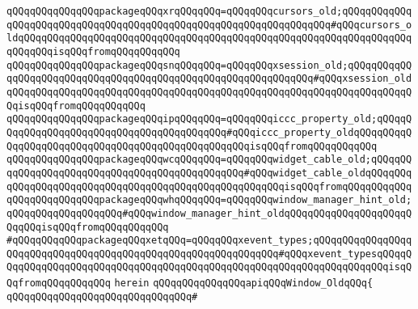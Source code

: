 \verb|qQQqqQQqqQQqqQQqpackageqQQqxrqQQqqQQq=qQQqqQQqcursors_old;qQQqqQQqqQQqqQQqqQQqqQQqqQQqqQQqqQQqqQQqqQQqqQQqqQQqqQQqqQQqqQQqqQQq#qQQqcursors_oldqQQqqQQqqQQqqQQqqQQqqQQqqQQqqQQqqQQqqQQqqQQqqQQqqQQqqQQqqQQqqQQqqQQqqQQqqQQqisqQQqfromqQQqqQQqqQQq|\newline
\verb|qQQqqQQqqQQqqQQqpackageqQQqsnqQQqqQQq=qQQqqQQqxsession_old;qQQqqQQqqQQqqQQqqQQqqQQqqQQqqQQqqQQqqQQqqQQqqQQqqQQqqQQqqQQqqQQq#qQQqxsession_oldqQQqqQQqqQQqqQQqqQQqqQQqqQQqqQQqqQQqqQQqqQQqqQQqqQQqqQQqqQQqqQQqqQQqqQQqisqQQqfromqQQqqQQqqQQq|\newline
\verb|qQQqqQQqqQQqqQQqpackageqQQqipqQQqqQQq=qQQqqQQqiccc_property_old;qQQqqQQqqQQqqQQqqQQqqQQqqQQqqQQqqQQqqQQqqQQq#qQQqiccc_property_oldqQQqqQQqqQQqqQQqqQQqqQQqqQQqqQQqqQQqqQQqqQQqqQQqqQQqisqQQqfromqQQqqQQqqQQq|\newline
\verb|qQQqqQQqqQQqqQQqpackageqQQqwcqQQqqQQq=qQQqqQQqwidget_cable_old;qQQqqQQqqQQqqQQqqQQqqQQqqQQqqQQqqQQqqQQqqQQqqQQq#qQQqwidget_cable_oldqQQqqQQqqQQqqQQqqQQqqQQqqQQqqQQqqQQqqQQqqQQqqQQqqQQqqQQqisqQQqfromqQQqqQQqqQQq|\newline
\verb|qQQqqQQqqQQqqQQqpackageqQQqwhqQQqqQQq=qQQqqQQqwindow_manager_hint_old;qQQqqQQqqQQqqQQqqQQq#qQQqwindow_manager_hint_oldqQQqqQQqqQQqqQQqqQQqqQQqqQQqisqQQqfromqQQqqQQqqQQq|\newline
\verb|#qQQqqQQqqQQqpackageqQQqxetqQQq=qQQqqQQqxevent_types;qQQqqQQqqQQqqQQqqQQqqQQqqQQqqQQqqQQqqQQqqQQqqQQqqQQqqQQqqQQqqQQq#qQQqxevent_typesqQQqqQQqqQQqqQQqqQQqqQQqqQQqqQQqqQQqqQQqqQQqqQQqqQQqqQQqqQQqqQQqqQQqqQQqisqQQqfromqQQqqQQqqQQq|\newline
\verb|herein|\newline
\newline
\verb|qQQqqQQqqQQqqQQqapiqQQqWindow_OldqQQq{|\newline
\verb|qQQqqQQqqQQqqQQqqQQqqQQqqQQqqQQq#|\newline
